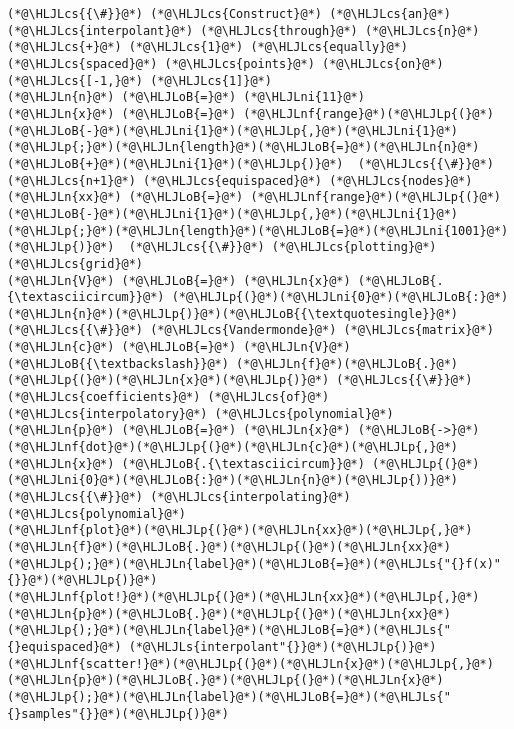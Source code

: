 \documentclass[12pt,a4paper]{article}
\newcommand{\HLJLn}[1]{#1}
\newcommand{\HLJLnf}[1]{\textcolor[RGB]{66,102,213}{#1}}
\newcommand{\HLJLs}[1]{\textcolor[RGB]{201,61,57}{#1}}
\newcommand{\HLJLni}[1]{\textcolor[RGB]{59,151,46}{#1}}
\newcommand{\HLJLoB}[1]{\textcolor[RGB]{102,102,102}{\textbf{#1}}}
\newcommand{\HLJLp}[1]{#1}
\newcommand{\HLJLcs}[1]{\textcolor[RGB]{153,153,119}{\textit{#1}}}
\begin{document}
\begin{lstlisting}
(*@\HLJLcs{{\#}}@*) (*@\HLJLcs{Construct}@*) (*@\HLJLcs{an}@*) (*@\HLJLcs{interpolant}@*) (*@\HLJLcs{through}@*) (*@\HLJLcs{n}@*) (*@\HLJLcs{+}@*) (*@\HLJLcs{1}@*) (*@\HLJLcs{equally}@*) (*@\HLJLcs{spaced}@*) (*@\HLJLcs{points}@*) (*@\HLJLcs{on}@*) (*@\HLJLcs{[-1,}@*) (*@\HLJLcs{1]}@*)
(*@\HLJLn{n}@*) (*@\HLJLoB{=}@*) (*@\HLJLni{11}@*)
(*@\HLJLn{x}@*) (*@\HLJLoB{=}@*) (*@\HLJLnf{range}@*)(*@\HLJLp{(}@*)(*@\HLJLoB{-}@*)(*@\HLJLni{1}@*)(*@\HLJLp{,}@*)(*@\HLJLni{1}@*)(*@\HLJLp{;}@*)(*@\HLJLn{length}@*)(*@\HLJLoB{=}@*)(*@\HLJLn{n}@*)(*@\HLJLoB{+}@*)(*@\HLJLni{1}@*)(*@\HLJLp{)}@*)  (*@\HLJLcs{{\#}}@*) (*@\HLJLcs{n+1}@*) (*@\HLJLcs{equispaced}@*) (*@\HLJLcs{nodes}@*)  
(*@\HLJLn{xx}@*) (*@\HLJLoB{=}@*) (*@\HLJLnf{range}@*)(*@\HLJLp{(}@*)(*@\HLJLoB{-}@*)(*@\HLJLni{1}@*)(*@\HLJLp{,}@*)(*@\HLJLni{1}@*)(*@\HLJLp{;}@*)(*@\HLJLn{length}@*)(*@\HLJLoB{=}@*)(*@\HLJLni{1001}@*)(*@\HLJLp{)}@*)  (*@\HLJLcs{{\#}}@*) (*@\HLJLcs{plotting}@*) (*@\HLJLcs{grid}@*)
(*@\HLJLn{V}@*) (*@\HLJLoB{=}@*) (*@\HLJLn{x}@*) (*@\HLJLoB{.{\textasciicircum}}@*) (*@\HLJLp{(}@*)(*@\HLJLni{0}@*)(*@\HLJLoB{:}@*)(*@\HLJLn{n}@*)(*@\HLJLp{)}@*)(*@\HLJLoB{{\textquotesingle}}@*) (*@\HLJLcs{{\#}}@*) (*@\HLJLcs{Vandermonde}@*) (*@\HLJLcs{matrix}@*)
(*@\HLJLn{c}@*) (*@\HLJLoB{=}@*) (*@\HLJLn{V}@*) (*@\HLJLoB{{\textbackslash}}@*) (*@\HLJLn{f}@*)(*@\HLJLoB{.}@*)(*@\HLJLp{(}@*)(*@\HLJLn{x}@*)(*@\HLJLp{)}@*) (*@\HLJLcs{{\#}}@*) (*@\HLJLcs{coefficients}@*) (*@\HLJLcs{of}@*) (*@\HLJLcs{interpolatory}@*) (*@\HLJLcs{polynomial}@*)
(*@\HLJLn{p}@*) (*@\HLJLoB{=}@*) (*@\HLJLn{x}@*) (*@\HLJLoB{->}@*) (*@\HLJLnf{dot}@*)(*@\HLJLp{(}@*)(*@\HLJLn{c}@*)(*@\HLJLp{,}@*) (*@\HLJLn{x}@*) (*@\HLJLoB{.{\textasciicircum}}@*) (*@\HLJLp{(}@*)(*@\HLJLni{0}@*)(*@\HLJLoB{:}@*)(*@\HLJLn{n}@*)(*@\HLJLp{))}@*)  (*@\HLJLcs{{\#}}@*) (*@\HLJLcs{interpolating}@*) (*@\HLJLcs{polynomial}@*)
(*@\HLJLnf{plot}@*)(*@\HLJLp{(}@*)(*@\HLJLn{xx}@*)(*@\HLJLp{,}@*)(*@\HLJLn{f}@*)(*@\HLJLoB{.}@*)(*@\HLJLp{(}@*)(*@\HLJLn{xx}@*)(*@\HLJLp{);}@*)(*@\HLJLn{label}@*)(*@\HLJLoB{=}@*)(*@\HLJLs{"{}f(x)"{}}@*)(*@\HLJLp{)}@*)
(*@\HLJLnf{plot!}@*)(*@\HLJLp{(}@*)(*@\HLJLn{xx}@*)(*@\HLJLp{,}@*)(*@\HLJLn{p}@*)(*@\HLJLoB{.}@*)(*@\HLJLp{(}@*)(*@\HLJLn{xx}@*)(*@\HLJLp{);}@*)(*@\HLJLn{label}@*)(*@\HLJLoB{=}@*)(*@\HLJLs{"{}equispaced}@*) (*@\HLJLs{interpolant"{}}@*)(*@\HLJLp{)}@*)
(*@\HLJLnf{scatter!}@*)(*@\HLJLp{(}@*)(*@\HLJLn{x}@*)(*@\HLJLp{,}@*)(*@\HLJLn{p}@*)(*@\HLJLoB{.}@*)(*@\HLJLp{(}@*)(*@\HLJLn{x}@*)(*@\HLJLp{);}@*)(*@\HLJLn{label}@*)(*@\HLJLoB{=}@*)(*@\HLJLs{"{}samples"{}}@*)(*@\HLJLp{)}@*)
\end{lstlisting}
\end{document}
